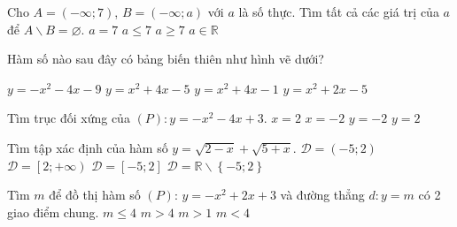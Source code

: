 \begin{ex}%
    Cho $A=\left(-\infty;7\right)$, $B=\left(-\infty;a\right)$ với $a$ là số thực. Tìm tất cả các giá trị của $a$ để $A\backslash B=\varnothing.$
    \choice
    {$a=7$}
    {$a\le 7$}
    {\True $a\ge 7$}
    {$a\in \mathbb{R}$}
\end{ex}
\begin{ex}%
    Hàm số nào sau đây có bảng biến thiên như hình vẽ dưới? 
    \begin{center}
    \end{center}
    \choice
    { $y = -x^2 -4x -9$}
    { $y = x^2 + 4x - 5$}
    {\True $y = x^2 + 4x - 1$}
    { $y = x^2 + 2x -5$}
\end{ex}
\begin{ex}%
    Tìm trục đối xứng của $(P):y=-x^2-4x+3$.
    \choice
    {$x=2$}
    {\True $x=-2$}
    {$y=-2$}
    {$y=2$}
\end{ex}
\begin{ex}%
    Tìm tập xác định của hàm số $y=\sqrt{2-x}+\sqrt{5+x}$.
    \choice
    {$\mathscr D=\left(-5;2\right)$}
    {$\mathscr D=\left[2;+\infty \right)$}
    {\True $\mathscr D=\left[-5;2\right]$}
    {$\mathscr D=\mathbb{R}\backslash \left\{-5;2\right\}$}
\end{ex}
\begin{ex}%
    Tìm $m$ để đồ thị hàm số $(P)$: $y=-x^2+2x+3$ và đường thẳng $d:y=m$ có 2 giao điểm chung.
    \choice
    {$m\le 4$}
    {$m>4$}
    {$m>1$}
    {\True $m<4$}
\end{ex}
